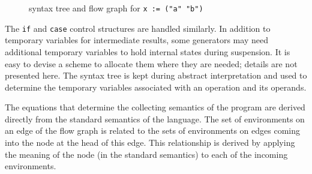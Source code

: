 \begin{figure}[htb]
\begin{center}
\end{center}
\caption{syntax tree and flow graph for \texttt{x := ("a" {\textbar} "b")}}
\end{figure}

The \texttt{if} and \texttt{case} control structures are handled
similarly. In addition to temporary variables for intermediate
results, some generators may need additional temporary variables to
hold internal states during suspension. It is easy to devise a scheme
to allocate them where they are needed; details are not presented
here. The syntax tree is kept during abstract interpretation and used
to determine the temporary variables associated with an operation and
its operands.

The equations that determine the collecting semantics of the program
are derived directly from the standard semantics of the language. The
set of environments on an edge of the flow graph is related to the
sets of environments on edges coming into the node at the head of this
edge. This relationship is derived by applying the meaning of the node
(in the standard semantics) to each of the incoming environments.

